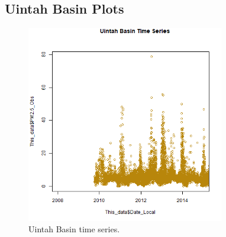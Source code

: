 
\subsection*{Uintah Basin Plots}
\begin{figure} 
\centering 
\includegraphics[width=0.77\textwidth]{Code_Outputs/UintahBasin_time_series.png} 
\caption{\label{fig:UintahBasinTS}Uintah Basin time series.} 
\end{figure} 
 
